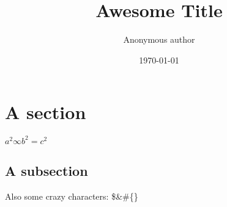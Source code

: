 \documentclass{article}%
\title{Awesome Title}%
\author{Anonymous author}%
\date{\today}%
\begin{document}
%
\normalsize%
\maketitle%
\section{A section}%
\label{sec:A section}%
$a^{2} \infty b^{2} = c^{2}$%
\subsection{A subsection}%
\label{subsec:A subsection}%
Also some crazy characters: \$\&\#\{\}

%
\end{document}
